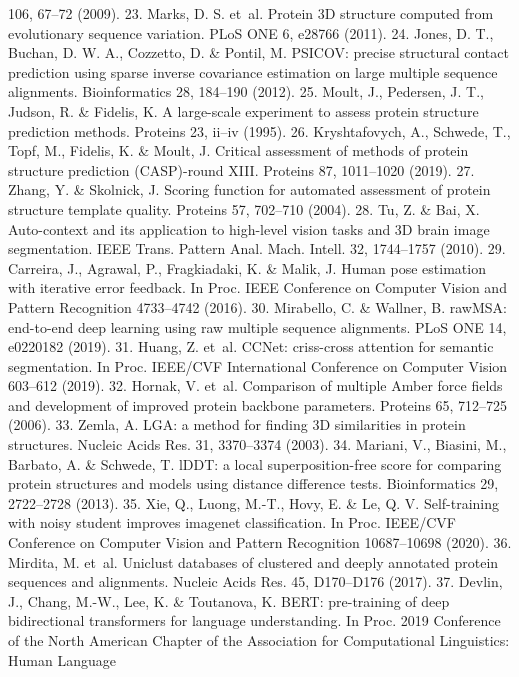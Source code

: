 106, 67–72 (2009).
23.	 Marks, D. S. et al. Protein 3D structure computed from evolutionary sequence variation.
PLoS ONE 6, e28766 (2011).
24.	 Jones, D. T., Buchan, D. W. A., Cozzetto, D. \& Pontil, M. PSICOV: precise structural contact
prediction using sparse inverse covariance estimation on large multiple sequence
alignments. Bioinformatics 28, 184–190 (2012).
25.	 Moult, J., Pedersen, J. T., Judson, R. \& Fidelis, K. A large-scale experiment to assess protein
structure prediction methods. Proteins 23, ii–iv (1995).
26.	 Kryshtafovych, A., Schwede, T., Topf, M., Fidelis, K. \& Moult, J. Critical assessment of
methods of protein structure prediction (CASP)-round XIII. Proteins 87, 1011–1020 (2019).
27.
Zhang, Y. \& Skolnick, J. Scoring function for automated assessment of protein structure
template quality. Proteins 57, 702–710 (2004).
28.	 Tu, Z. \& Bai, X. Auto-context and its application to high-level vision tasks and 3D brain
image segmentation. IEEE Trans. Pattern Anal. Mach. Intell. 32, 1744–1757 (2010).
29.	 Carreira, J., Agrawal, P., Fragkiadaki, K. \& Malik, J. Human pose estimation with iterative
error feedback. In Proc. IEEE Conference on Computer Vision and Pattern Recognition
4733–4742 (2016).
30.	 Mirabello, C. \& Wallner, B. rawMSA: end-to-end deep learning using raw multiple
sequence alignments. PLoS ONE 14, e0220182 (2019).
31.
Huang, Z. et al. CCNet: criss-cross attention for semantic segmentation. In Proc. IEEE/CVF
International Conference on Computer Vision 603–612 (2019).
32.	 Hornak, V. et al. Comparison of multiple Amber force fields and development of
improved protein backbone parameters. Proteins 65, 712–725 (2006).
33.	 Zemla, A. LGA: a method for finding 3D similarities in protein structures. Nucleic Acids
Res. 31, 3370–3374 (2003).
34.	 Mariani, V., Biasini, M., Barbato, A. \& Schwede, T. lDDT: a local superposition-free score for
comparing protein structures and models using distance difference tests. Bioinformatics
29, 2722–2728 (2013).
35.	 Xie, Q., Luong, M.-T., Hovy, E. \& Le, Q. V. Self-training with noisy student improves
imagenet classification. In Proc. IEEE/CVF Conference on Computer Vision and Pattern
Recognition 10687–10698 (2020).
36.	 Mirdita, M. et al. Uniclust databases of clustered and deeply annotated protein
sequences and alignments. Nucleic Acids Res. 45, D170–D176 (2017).
37.
Devlin, J., Chang, M.-W., Lee, K. \& Toutanova, K. BERT: pre-training of deep bidirectional
transformers for language understanding. In Proc. 2019 Conference of the North
American Chapter of the Association for Computational Linguistics: Human Language
